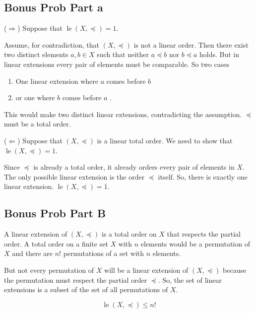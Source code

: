 \documentclass{report}
\begin{document}
\subsection*{Bonus Prob Part a}

\begin{proofWithHibiscus}
  (\(\Rightarrow\)) Suppose that $\operatorname{le}(X, \preceq) = 1$. 

  \bigskip
  
  Assume, for contradiction, that $(X, \preceq)$ is not a linear order. Then there exist two distinct elements 
  $a, b \in X$ such that neither $a \preceq b$ nor $b \preceq a$ holds. But in linear extensions every pair of elements must be comparable. So two cases 
  \begin{enumerate}
    \item One linear extension where $a$ comes before $b$ 
    \item or one where $b$ comes before $a$ .
  \end{enumerate}
  This would make two distinct linear extensions, contradicting the assumption. $\preceq$ must be a total order.

  \bigskip
  
  (\(\Leftarrow\)) Suppose that $(X, \preceq)$ is a linear total order. We need to show that $\operatorname{le}(X, \preceq) = 1$.

  \bigskip
  
  Since $\preceq$ is already a total order, it already orders every pair of elements in $X$. The only possible linear extension is the order $\preceq$ itself. So, there is exactly one linear extension. $\operatorname{le}(X, \preceq) = 1$.
\end{proofWithHibiscus}

\subsection*{Bonus Prob Part B}


\begin{proofWithHibiscus}
  A linear extension of $(X, \preceq)$ is  a total order on $X$ that respects the partial order. A total order on a finite set $X$ with $n$ elements would be a permutation of $X$ and there are $n!$ permutations of a set with $n$ elements. 

  But not every permutation of $X$ will be a linear extension of $(X, \preceq)$ because the permutation must respect the partial order $\preceq$. So, the set of linear extensions is a subset of the set of all permutations of $X$.

  \[ \operatorname{le}(X, \preceq) \leq n! \]

\end{proofWithHibiscus}
\end{document}
